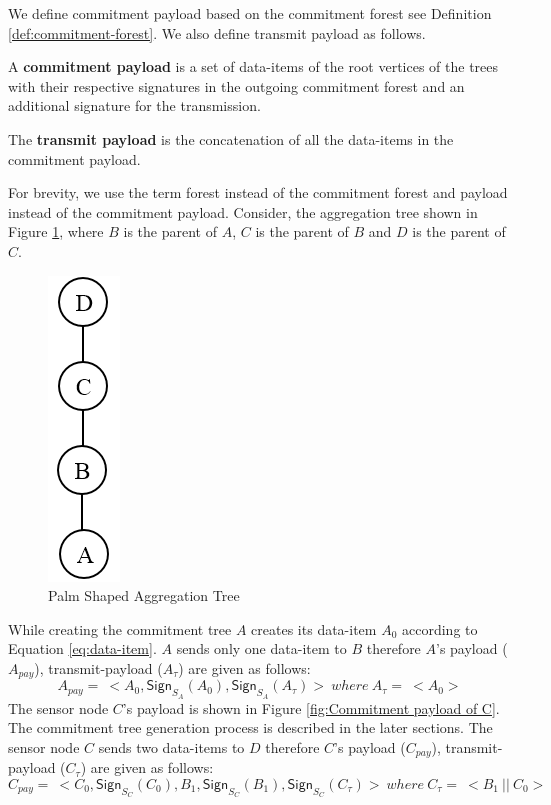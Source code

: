 	We define commitment payload based on the commitment forest see Definition \ref{def:commitment-forest}.
	We also define transmit payload as follows.
	\begin{definition}
		A \textbf{commitment payload} is a set of data-items of the root vertices of the trees with their respective signatures in the outgoing commitment forest and an additional signature for the transmission.
	\end{definition}
	\begin{definition}
		The \textbf{transmit payload} is the concatenation of all the data-items in the commitment payload.
	\end{definition}
	For brevity, we use the term forest instead of the commitment forest and payload instead of the commitment payload.
	Consider, the aggregation tree shown in Figure \ref{fig:Palm aggregation tree}, where $B$ is the parent of $A$, $C$ is the parent of $B$ and $D$ is the parent of $C$. 
	\begin{figure}[h!]
		\centering
		\includegraphics[scale = 1]{images/palm-aggregation-tree.png}
		\caption{Palm Shaped Aggregation Tree}
		\label{fig:Palm aggregation tree}
	\end{figure}
	While creating the commitment tree $A$ creates its data-item $A_{0}$ according to Equation \ref{eq:data-item}.
	$A$ sends only one data-item to $B$ therefore $A$'s payload ($A_{pay}$), transmit-payload ($A_{\tau}$) are given as follows:
	\begin{equation}
		\label{eq:signing-payload}
			A_{pay} =\ <A_{0}, \textsf{Sign}_{S_{A}}(A_{0}), \textsf{Sign}_{S_{A}}(A_{\tau}) >\ where\ A_{\tau} =\ < A_{0} > 
	\end{equation}
	The sensor node $C$'s payload is shown in Figure \ref{fig:Commitment payload of C}.
	The commitment tree generation process is described in the later sections. 
	The sensor node $C$ sends two data-items to $D$ therefore $C$'s payload ($C_{pay}$), transmit-payload ($C_{\tau}$) are given as follows:
	\begin{equation*}
		 	C_{pay} =\ <C_{0}, \textsf{Sign}_{S_{C}}(C_{0}), B_{1}, \textsf{Sign}_{S_{C}}(B_{1}), \textsf{Sign}_{S_{C}}(C_{\tau}) >\ where\ C_{\tau} =\ <B_{1}\ ||\ C_{0}>
	\end{equation*}

